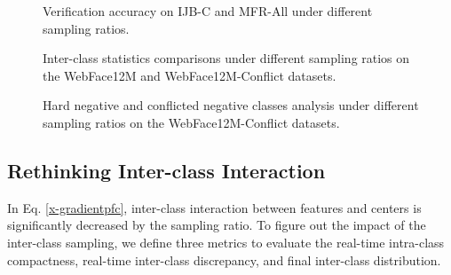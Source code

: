 \documentclass[10pt,twocolumn,letterpaper]{article}
\begin{document}
\begin{figure}
\centering
{}
\vspace{-2mm}
\caption{Verification accuracy on IJB-C and MFR-All under different sampling ratios.}
\vspace{-4mm}
\label{fig:verificationacc}
\end{figure}

\begin{figure}[h]
\centering
{}
\vspace{-2mm}
\caption{Inter-class statistics comparisons under different sampling ratios on the WebFace12M and WebFace12M-Conflict datasets.}
\vspace{-4mm}
\label{fig:interclassnoise}
\end{figure}

\begin{figure}[h]
\centering
{}
\vspace{-2mm}
\caption{Hard negative and conflicted negative classes analysis under different sampling ratios on the WebFace12M-Conflict datasets.}
\vspace{-4mm}
\label{fig:interclassnoisesplit}
\end{figure}

\subsection{Rethinking Inter-class Interaction}
In Eq. \ref{x-gradientpfc}, inter-class interaction between features and centers is significantly decreased by the sampling ratio.
To figure out the impact of the inter-class sampling,
we define three metrics to evaluate the real-time intra-class compactness, real-time inter-class discrepancy, and final inter-class distribution.
\end{document}
